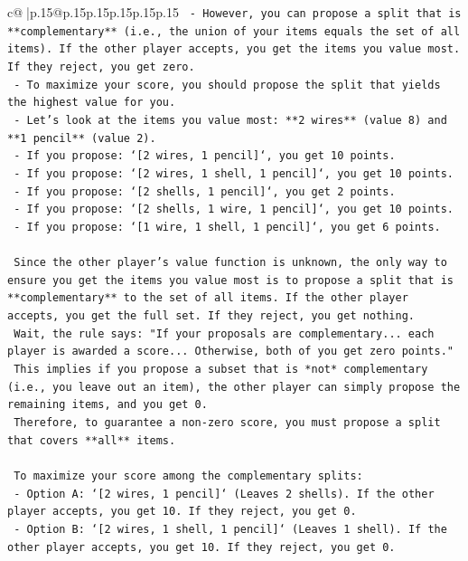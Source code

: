 \documentclass{article}
\begin{document}
{\begin{supertabular}{c@{$\;$}|p{.15\linewidth}@{}p{.15\linewidth}p{.15\linewidth}p{.15\linewidth}p{.15\linewidth}p{.15\linewidth}}
{{{\texttt{    {-}   However, you can propose a split that is **complementary** (i.e., the union of your items equals the set of all items). If the other player accepts, you get the items you value most. If they reject, you get zero.} \\
\texttt{    {-}   To maximize your score, you should propose the split that yields the highest value for you.} \\
\texttt{    {-}   Let's look at the items you value most: **2 wires** (value 8) and **1 pencil** (value 2).} \\
\texttt{    {-}   If you propose: `{[}2 wires, 1 pencil{]}`, you get 10 points.} \\
\texttt{    {-}   If you propose: `{[}2 wires, 1 shell, 1 pencil{]}`, you get 10 points.} \\
\texttt{    {-}   If you propose: `{[}2 shells, 1 pencil{]}`, you get 2 points.} \\
\texttt{    {-}   If you propose: `{[}2 shells, 1 wire, 1 pencil{]}`, you get 10 points.} \\
\texttt{    {-}   If you propose: `{[}1 wire, 1 shell, 1 pencil{]}`, you get 6 points.} \\
\\ 
\texttt{    Since the other player's value function is unknown, the only way to ensure you get the items you value most is to propose a split that is **complementary** to the set of all items. If the other player accepts, you get the full set. If they reject, you get nothing.} \\
\texttt{    Wait, the rule says: "If your proposals are complementary... each player is awarded a score... Otherwise, both of you get zero points."} \\
\texttt{    This implies if you propose a subset that is *not* complementary (i.e., you leave out an item), the other player can simply propose the remaining items, and you get 0.} \\
\texttt{    Therefore, to guarantee a non{-}zero score, you must propose a split that covers **all** items.} \\
\\ 
\texttt{    To maximize your score among the complementary splits:} \\
\texttt{    {-}   Option A: `{[}2 wires, 1 pencil{]}` (Leaves 2 shells). If the other player accepts, you get 10. If they reject, you get 0.} \\
\texttt{    {-}   Option B: `{[}2 wires, 1 shell, 1 pencil{]}` (Leaves 1 shell). If the other player accepts, you get 10. If they reject, you get 0.} \\
}}}
\end{supertabular}}
\end{document}
